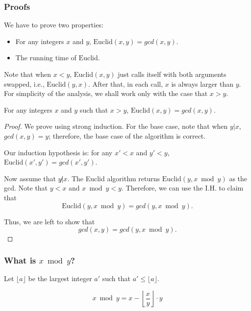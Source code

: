 \begin{frame}
  \frametitle{Proofs}

  We have to prove two properties:
  \begin{itemize}
  \item For any integers $x$ and $y$, $\mathrm{Euclid}(x,y) = gcd(x,y)$.
  \item The running time of $\mathrm{Euclid}$.
  \end{itemize}

  \vspace{0.2in}

  \pause Note that when $x<y$, $\mathrm{Euclid}(x,y)$ just calls
  itself with both arguments swapped, i.e., $\mathrm{Euclid}(y,x)$.
  After that, in each call, $x$ is always larger than $y$.  For
  simplicity of the analysis, we shall work only with the case that $x
  > y$.
\end{frame}

\begin{frame}
  \begin{theorem}
    For any integers $x$ and $y$ such that $x>y$,
    $\mathrm{Euclid}(x,y) = gcd(x,y)$.
  \end{theorem}
  \begin{proof}
    {\small

      We prove using strong induction.  For the base case, note that
      when $y|x$, $gcd(x,y)=y$; therefore, the base case of the
      algorithm is correct.

      Our induction hypothesis is: for any $x'<x$ and $y'<y$,
      $\mathrm{Euclid}(x',y')=gcd(x',y')$.
    
      Now assume that $y\not| x$.  The Euclid algorithm returns
      $\mathrm{Euclid}(y, x\bmod y)$ as the gcd.  Note that $y < x$
      and $x\bmod y < y$.  Therefore, we can use the I.H. to claim that
      \[
      \mathrm{Euclid}(y, x\bmod y) = gcd(y, x\bmod y).
      \]

      Thus, we are left to show that
      \[
      gcd(x,y) = gcd(y, x\bmod y).
      \]
    }
  \end{proof}
\end{frame}

\begin{frame}
  \frametitle{What is $x \bmod y$?}

  \pause Let $\lfloor a \rfloor$ be the largest integer $a'$ such that
  $a'\leq \lfloor a\rfloor$.
  
  \pause
  \[
  x\bmod y = x - \left\lfloor\frac{x}{y}\right\rfloor\cdot y
  \]
\end{frame}

